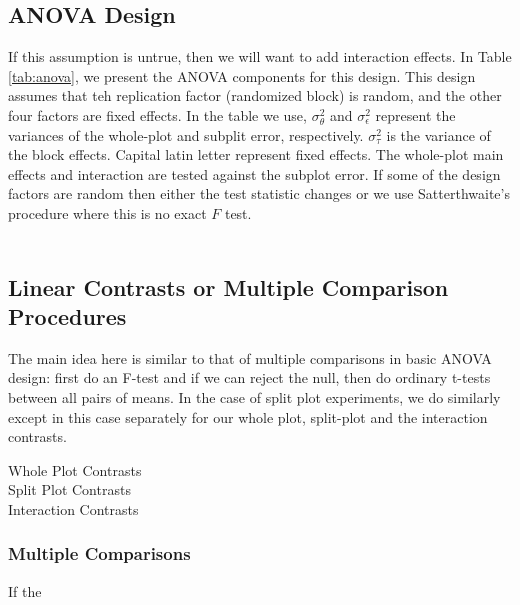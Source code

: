 \documentclass{article}
\begin{document}
\subsection{ANOVA Design}
If this assumption is untrue, then we will want to add interaction effects. In Table \ref{tab:anova}, we present the ANOVA components for this design. This design assumes that teh replication factor (randomized block) is random, and the other four factors are fixed effects. In the table we use, $\sigma_{\theta}^{2}$ and $\sigma_{\epsilon}^{2}$ represent the variances of the whole-plot and subplit error, respectively. $\sigma_{\tau}^{2}$ is the variance of the block effects. Capital latin letter represent fixed effects. The whole-plot main effects and interaction are tested against the subplot error. If some of the design factors are random then either the test statistic changes or we use Satterthwaite's procedure where this is no exact $F$ test.\\ 
\\
\subsection{Linear Contrasts or Multiple Comparison Procedures} The main idea here is similar to that of multiple comparisons in basic ANOVA design: first do an F-test and if we can reject the null, then do ordinary t-tests between all pairs of means. In the case of split plot experiments, we do similarly except in this case separately for our whole plot, split-plot and the interaction contrasts. 
\begin{description}
    \item[Whole Plot Contrasts]
    \item[Split Plot Contrasts]
    \item[Interaction Contrasts]
\end{description}

\subsubsection{Multiple Comparisons} If the 
\end{document}
